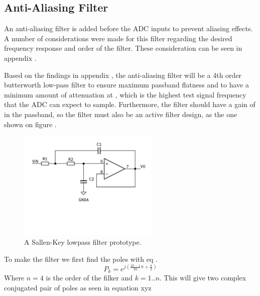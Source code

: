 \subsection{Anti-Aliasing Filter} \label{subsec:AAFilter}

An anti-aliasing filter is added before the ADC inputs to prevent aliasing effects. A number of considerations were made for this filter regarding the desired frequency response and order of the filter. These consideration can be seen in appendix .

Based on the findings in appendix , the anti-aliasing filter will be a 4th order butterworth low-pass filter to ensure maximum passband flatness and to have a minimum amount of attenuation at , which is the highest test signal frequency that the ADC can expect to sample. Furthermore, the filter should have a gain of  in the passband, so the filter must also be an active filter design, as the one shown on figure .

\begin{figure}[H]
    \centering
    \includegraphics[clip, trim=0 150 0 0, width=0.6\textwidth]{Sections/7_SystemDesign/Figures/7_1_4_AAF_SALLENKEY.pdf}
    \caption{A Sallen-Key lowpass filter prototype.}
    \label{fig_7_1_4_SALLENKEY}
\end{figure}

To make the filter we first find the poles with eq \cite{ANALOGFILTERS}.
\begin{equation}\label{eq:7_1_4_LPPoles}
    P_k = e^{j(\frac{2k-1}{2n}\pi + \frac{\pi}{2}  )} 
\end{equation}
Where $n = 4$ is the order of the filker and $k = 1..n$. This will give two complex conjugated pair of poles as seen in equation xyz

